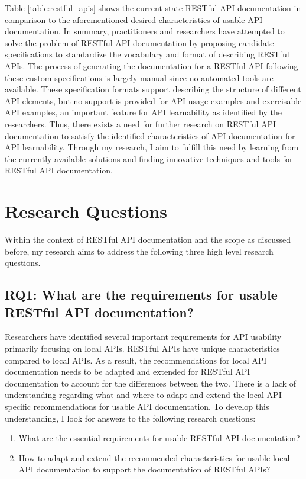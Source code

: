 \documentclass[11pt,oneside]{book}
\begin{document}
Table \ref{table:restful_apis} shows the current state RESTful API documentation in comparison to the aforementioned desired characteristics of usable API documentation. In summary, practitioners and researchers have attempted to solve the problem of RESTful API documentation by proposing candidate specifications to standardize the vocabulary and format of describing RESTful APIs. The process of generating the documentation for a RESTful API following these custom specifications is largely manual since no automated tools are available. These specification formats support describing the structure of different API elements, but no support is provided for API usage examples and exercisable API examples, an important feature for API learnability as identified by the researchers. Thus, there exists a need for further research on RESTful API documentation to satisfy the identified characteristics of API documentation for API learnability. Through my research, I aim to fulfill this need by learning from the currently available solutions and finding innovative techniques and tools for RESTful API documentation.


\chapter{Research Questions}

Within the context of RESTful API documentation and the scope as discussed before, my research aims to address the following three high level research questions.

\section{RQ1: What are the requirements for usable RESTful API documentation?
}

Researchers have identified several important requirements for API usability primarily focusing on local APIs. RESTful APIs have unique characteristics compared to local APIs. As a result, the recommendations for local API documentation needs to be adapted and extended for RESTful API documentation to account for the differences between the two. There is a lack of understanding regarding what and where to adapt and extend the local API specific recommendations for usable API documentation. To develop this understanding, I look for answers to the following research questions:

\begin{enumerate}
  \item What are the essential requirements for usable RESTful API documentation?
  \item How to adapt and extend the recommended characteristics for usable local API documentation to support the documentation of RESTful APIs?
\end{enumerate}
\end{document}
